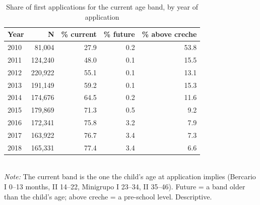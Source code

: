 \begin{table}[htbp]\centering
\caption{Share of first applications for the current age band, by year of application}
\label{tab:A3_faixa_ano}
\small
\setlength{\tabcolsep}{4pt}
\begin{tabular}{lrrrr}
\toprule
Year & N & \% current & \% future & \% above creche \\
\midrule
2010 & 81,004 & 27.9 & 0.2 & 53.8 \\
2011 & 124,240 & 48.0 & 0.1 & 15.5 \\
2012 & 220,922 & 55.1 & 0.1 & 13.1 \\
2013 & 191,149 & 59.2 & 0.1 & 15.3 \\
2014 & 174,676 & 64.5 & 0.2 & 11.6 \\
2015 & 179,869 & 71.3 & 0.5 & 9.2 \\
2016 & 172,341 & 75.8 & 3.2 & 7.9 \\
2017 & 163,922 & 76.7 & 3.4 & 7.3 \\
2018 & 165,331 & 77.4 & 3.4 & 6.6 \\
\bottomrule
\end{tabular}
\\[3pt]{\footnotesize \textit{Note:} The current band is the one the child's age at application implies (Bercario I 0--13 months, II 14--22, Minigrupo I 23--34, II 35--46). Future = a band older than the child's age; above creche = a pre-school level. Descriptive.}
\end{table}
